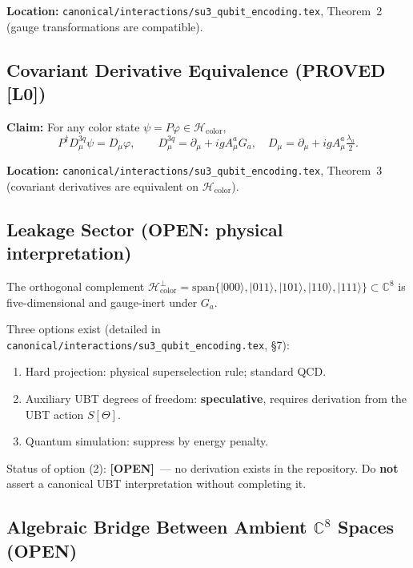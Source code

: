 \documentclass[11pt,a4paper]{article}
\newcommand{\C}{\mathbb{C}}
\newcommand{\Lzero}{\textbf{[L0]}}
\newcommand{\OPEN}{\textbf{[OPEN]}}
\begin{document}
\textbf{Location:}
\texttt{canonical/interactions/su3\_qubit\_encoding.tex},
Theorem~2 (gauge transformations are compatible).

\subsection{Covariant Derivative Equivalence (PROVED \Lzero)}
\label{sec:bridges:su3_gauge_qubit:cov_deriv}

\textbf{Claim:} For any color state $\psi = P\varphi \in \mathcal{H}_{\mathrm{color}}$,
\[
  P^\dagger D_\mu^{3q} \psi = D_\mu \varphi,
  \qquad
  D_\mu^{3q} = \partial_\mu + ig A_\mu^a G_a,
  \quad
  D_\mu = \partial_\mu + ig A_\mu^a \tfrac{\lambda_a}{2}.
\]

\textbf{Location:}
\texttt{canonical/interactions/su3\_qubit\_encoding.tex},
Theorem~3 (covariant derivatives are equivalent on $\mathcal{H}_{\mathrm{color}}$).

\subsection{Leakage Sector (OPEN: physical interpretation)}
\label{sec:bridges:su3_gauge_qubit:leakage}

\begin{tcolorbox}[colback=orange!10!white,colframe=orange!75!black,
  title=Open problem: leakage sector]
The orthogonal complement
$\mathcal{H}_{\mathrm{color}}^\perp = \mathrm{span}\{|000\rangle, |011\rangle,
|101\rangle, |110\rangle, |111\rangle\} \subset \C^8$
is five-dimensional and gauge-inert under $G_a$.

\medskip
Three options exist (detailed in
\texttt{canonical/interactions/su3\_qubit\_encoding.tex}, \S7):
\begin{enumerate}
  \item Hard projection: physical superselection rule; standard QCD.
  \item Auxiliary UBT degrees of freedom: \textbf{speculative}, requires
        derivation from the UBT action $S[\Theta]$.
  \item Quantum simulation: suppress by energy penalty.
\end{enumerate}

Status of option (2): \OPEN\ — no derivation exists in the repository.
Do \textbf{not} assert a canonical UBT interpretation without completing it.
\end{tcolorbox}

\subsection{Algebraic Bridge Between Ambient $\C^8$ Spaces (OPEN)}
\label{sec:bridges:su3_gauge_qubit:ambient_bridge}
\end{document}
